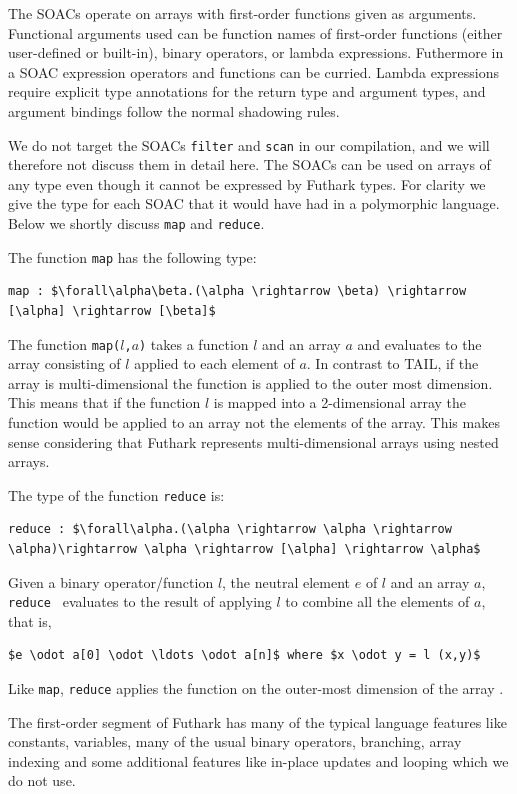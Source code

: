 \documentclass[11pt]{article}
\begin{document}
The SOACs operate on arrays with first-order functions given as arguments.
Functional arguments used can be function names of first-order functions (either user-defined or built-in), 
binary operators, or lambda expressions.
Futhermore in a SOAC expression operators and functions can be curried. Lambda expressions require explicit type annotations for
the return type and argument types, and argument bindings follow the normal shadowing rules.

We do not target the SOACs {\tt filter} and {\tt scan} in our compilation, and we will therefore not discuss them in detail here.
The SOACs can be used on arrays of any type even though it cannot be expressed by Futhark types.
For clarity we give the type for each SOAC that it would have had in a polymorphic language.
Below we shortly discuss {\tt map} and {\tt reduce}.

The function {\tt map} has the following type: 
\begin{lstlisting}[numbers=none,frame=none]
map : $\forall\alpha\beta.(\alpha \rightarrow \beta) \rightarrow [\alpha] \rightarrow [\beta]$
\end{lstlisting}
The function {\tt map($l$,$a$)} takes a function $l$ and an array $a$ and evaluates to the array consisting of $l$ applied to each element of $a$.
In contrast to TAIL, if the array is multi-dimensional the function is applied to the outer most dimension.
This means that if the function $l$ is mapped into a 2-dimensional array the function would be applied to an array not the elements
of the array. This makes sense considering that Futhark represents multi-dimensional arrays using nested arrays.

The type of the function {\tt reduce} is: 
\begin{lstlisting}[numbers=none,frame=none]
reduce : $\forall\alpha.(\alpha \rightarrow \alpha \rightarrow \alpha)\rightarrow \alpha \rightarrow [\alpha] \rightarrow \alpha$
\end{lstlisting}
Given a binary operator/function $l$, the neutral element $e$ of $l$ and an array $a$,
{\tt reduce } evaluates to the result of applying $l$ to combine all the elements of $a$, that is,
\begin{lstlisting}[numbers=none,frame=none]
$e \odot a[0] \odot \ldots \odot a[n]$ where $x \odot y = l (x,y)$
\end{lstlisting}
Like {\tt map}, {\tt reduce} applies the function on the outer-most dimension of the array \cite{TroelsHenriksen}.

The first-order segment of Futhark has many of the typical language features like constants, variables, many of the usual binary operators, branching, array indexing and some additional features like in-place updates and looping which we do not use.
\end{document}
